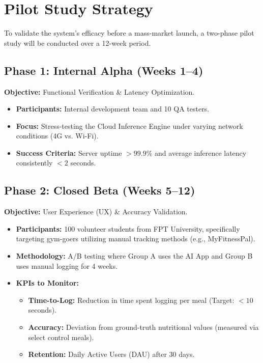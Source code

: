 \documentclass[fleqn,10pt]{SelfArx} %
\begin{document}

\section{Pilot Study Strategy}

To validate the system's efficacy before a mass-market launch, a two-phase pilot study will be conducted over a 12-week period.

\subsection{Phase 1: Internal Alpha (Weeks 1--4)}
\textbf{Objective:} Functional Verification \& Latency Optimization.
\begin{itemize}[noitemsep]
    \item \textbf{Participants:} Internal development team and 10 QA testers.
    \item \textbf{Focus:} Stress-testing the Cloud Inference Engine under varying network conditions (4G vs. Wi-Fi).
    \item \textbf{Success Criteria:} Server uptime $>99.9\%$ and average inference latency consistently $<2$ seconds.
\end{itemize}

\subsection{Phase 2: Closed Beta (Weeks 5--12)}
\textbf{Objective:} User Experience (UX) \& Accuracy Validation.
\begin{itemize}[noitemsep]
    \item \textbf{Participants:} 100 volunteer students from FPT University, specifically targeting gym-goers utilizing manual tracking methods (e.g., MyFitnessPal).
    \item \textbf{Methodology:} A/B testing where Group A uses the AI App and Group B uses manual logging for 4 weeks.
    \item \textbf{KPIs to Monitor:}
    \begin{itemize}
        \item \textbf{Time-to-Log:} Reduction in time spent logging per meal (Target: $<10$ seconds).
        \item \textbf{Accuracy:} Deviation from ground-truth nutritional values (measured via select control meals).
        \item \textbf{Retention:} Daily Active Users (DAU) after 30 days.
    \end{itemize}
\end{itemize}
\end{document}
